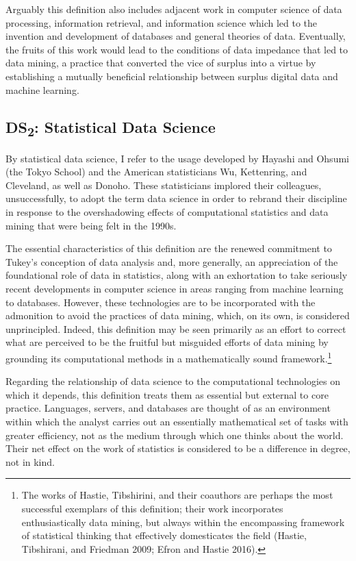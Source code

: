 \documentclass[
  letterpaper,
]{report}
\begin{document}
Arguably this definition also includes adjacent work in computer science
of data processing, information retrieval, and information science which
led to the invention and development of databases and general theories
of data. Eventually, the fruits of this work would lead to the
conditions of data impedance that led to data mining, a practice that
converted the vice of surplus into a virtue by establishing a mutually
beneficial relationship between surplus digital data and machine
learning.

\hypertarget{ds2-statistical-data-science}{%
\subsection{\texorpdfstring{DS\textsubscript{2}: Statistical Data
Science}{DS2: Statistical Data Science}}\label{ds2-statistical-data-science}}

By statistical data science, I refer to the usage developed by Hayashi
and Ohsumi (the Tokyo School) and the American statisticians Wu,
Kettenring, and Cleveland, as well as Donoho. These statisticians
implored their colleagues, unsuccessfully, to adopt the term data
science in order to rebrand their discipline in response to the
overshadowing effects of computational statistics and data mining that
were being felt in the 1990s.

The essential characteristics of this definition are the renewed
commitment to Tukey's conception of data analysis and, more generally,
an appreciation of the foundational role of data in statistics, along
with an exhortation to take seriously recent developments in computer
science in areas ranging from machine learning to databases. However,
these technologies are to be incorporated with the admonition to avoid
the practices of data mining, which, on its own, is considered
unprincipled. Indeed, this definition may be seen primarily as an effort
to correct what are perceived to be the fruitful but misguided efforts
of data mining by grounding its computational methods in a
mathematically sound framework.\footnote{The works of Hastie,
  Tibshirini, and their coauthors are perhaps the most successful
  exemplars of this definition; their work incorporates enthusiastically
  data mining, but always within the encompassing framework of
  statistical thinking that effectively domesticates the field (Hastie,
  Tibshirani, and Friedman 2009; Efron and Hastie 2016).}

Regarding the relationship of data science to the computational
technologies on which it depends, this definition treats them as
essential but external to core practice. Languages, servers, and
databases are thought of as an environment within which the analyst
carries out an essentially mathematical set of tasks with greater
efficiency, not as the medium through which one thinks about the world.
Their net effect on the work of statistics is considered to be a
difference in degree, not in kind.
\end{document}

